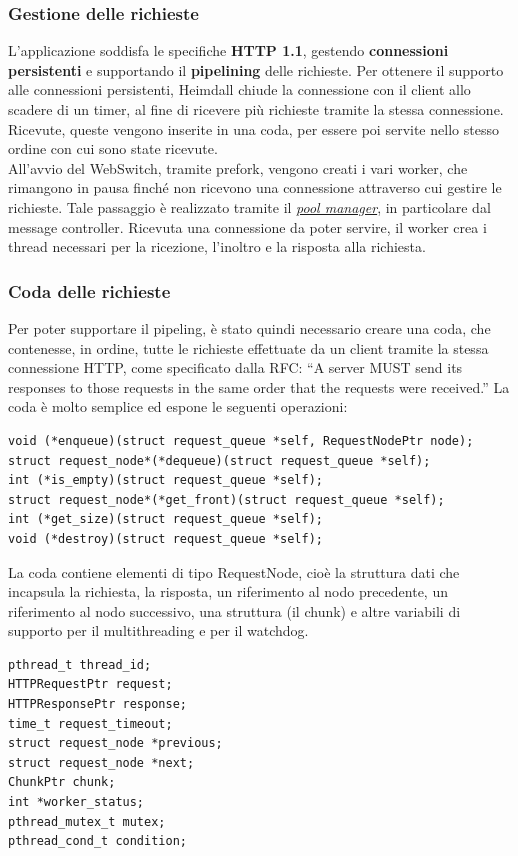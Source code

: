 \documentclass[italian]{tktltiki2}
\begin{document}
\subsubsection{Gestione delle richieste}
\label{sec:requests_management}
L'applicazione soddisfa le specifiche \textbf{HTTP 1.1}\cite{http_1.1}, gestendo \textbf{connessioni persistenti}\cite{persistent_connections} e supportando il \textbf{pipelining}\cite{pipeling} delle richieste. Per ottenere il supporto alle connessioni persistenti, Heimdall chiude la connessione con il client allo scadere di un timer, al fine di ricevere più richieste tramite la stessa connessione. Ricevute, queste vengono inserite in una coda, per essere poi servite nello stesso ordine con cui sono state ricevute.
\\
All'avvio del WebSwitch, tramite prefork, vengono creati i vari worker, che rimangono in pausa finché non ricevono una connessione attraverso cui gestire le richieste. Tale passaggio è realizzato tramite il \hyperref[sec:pool]{\emph{pool manager}}, in particolare dal message controller. Ricevuta una connessione da poter servire, il worker crea i thread necessari per la ricezione, l'inoltro e la risposta alla richiesta.

\subsubsection*{Coda delle richieste}
\label{sec:requests_queue}
Per poter supportare il pipeling, è stato quindi necessario creare una coda, che contenesse, in ordine, tutte le richieste effettuate da un client tramite la stessa connessione HTTP, come specificato dalla RFC: ``A server MUST send its responses to those requests in the same order that the requests were received.''\cite{pipeling}
La coda è molto semplice ed espone le seguenti operazioni:
\begin{lstlisting}
void (*enqueue)(struct request_queue *self, RequestNodePtr node);
struct request_node*(*dequeue)(struct request_queue *self);
int (*is_empty)(struct request_queue *self);
struct request_node*(*get_front)(struct request_queue *self);
int (*get_size)(struct request_queue *self);
void (*destroy)(struct request_queue *self);
\end{lstlisting}
La coda contiene elementi di tipo RequestNode, cioè la struttura dati che incapsula la richiesta, la risposta, un riferimento al nodo precedente, un riferimento al nodo successivo, una struttura (il chunk) e altre variabili di supporto per il multithreading e per il watchdog.
\begin{lstlisting}
pthread_t thread_id;
HTTPRequestPtr request;
HTTPResponsePtr response;
time_t request_timeout;
struct request_node *previous;
struct request_node *next;
ChunkPtr chunk;
int *worker_status;
pthread_mutex_t mutex;
pthread_cond_t condition;
\end{lstlisting}
\end{document}
